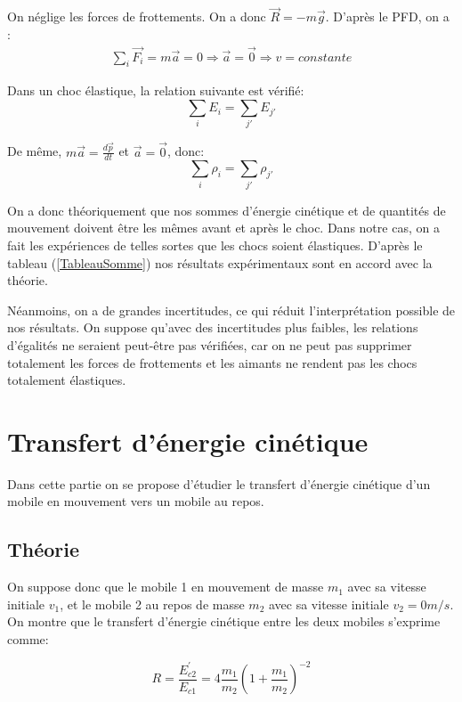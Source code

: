 \documentclass[12pt]{article}
\begin{document}
On néglige les forces de frottements. On a donc $\vec{R}=-m\vec{g}$. D'après le PFD, on a :
\begin{align*}
\sum_i\vec{F_i}=m\vec{a}=0\Rightarrow \vec{a}=\vec{0}\Rightarrow v=constante
\end{align*}

Dans un choc élastique, la relation suivante est vérifié:
\begin{equation}
\sum_i E_i=\sum_{j'}E_{j'}
\end{equation}

De même, $m\vec{a}=\frac{d\vec{p}}{dt}$ et $\vec{a}=\vec{0}$, donc:
\begin{equation}
\sum_i \rho_i=\sum_{j'}\rho_{j'}
\end{equation}

On a donc théoriquement que nos sommes d'énergie cinétique et de quantités de mouvement doivent être les mêmes avant et après le choc.
Dans notre cas, on a fait les expériences de telles sortes que les chocs soient élastiques. D'après le tableau (\ref{TableauSomme}) nos résultats expérimentaux sont en accord avec la théorie. 

Néanmoins, on a de grandes incertitudes, ce qui réduit l'interprétation possible de nos résultats. On suppose qu'avec des incertitudes plus faibles, les relations d'égalités ne seraient peut-être pas vérifiées, car  on ne peut pas supprimer totalement les forces de frottements et les aimants ne rendent pas  les chocs totalement élastiques.  

\newpage
\section{Transfert d'énergie cinétique}
Dans cette partie on se propose d'étudier le transfert d'énergie cinétique d'un mobile en mouvement vers 
un mobile au repos. 

\subsection{Théorie}
On suppose donc que le mobile 1 en mouvement de masse $m_1$ avec sa vitesse initiale $v_1$, et le mobile 2 au repos de masse $m_2$ avec sa vitesse initiale
$v_2 = 0 m/s$. On montre que le transfert d'énergie cinétique entre les deux mobiles s'exprime comme:

\begin{equation}
    R = \frac{E^{'}_{c2}}{E_{c1}} = 4 \frac{m_1}{m_2} \left(1 + \frac{m_1}{m_2} \right)^{-2}
\end{equation}
\end{document}
